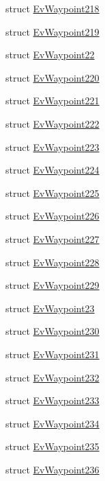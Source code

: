 \begin{DoxyCompactItemize}
\item 
struct \hyperlink{structcl__move__base__z_1_1EvWaypoint218}{Ev\+Waypoint218}
\item 
struct \hyperlink{structcl__move__base__z_1_1EvWaypoint219}{Ev\+Waypoint219}
\item 
struct \hyperlink{structcl__move__base__z_1_1EvWaypoint22}{Ev\+Waypoint22}
\item 
struct \hyperlink{structcl__move__base__z_1_1EvWaypoint220}{Ev\+Waypoint220}
\item 
struct \hyperlink{structcl__move__base__z_1_1EvWaypoint221}{Ev\+Waypoint221}
\item 
struct \hyperlink{structcl__move__base__z_1_1EvWaypoint222}{Ev\+Waypoint222}
\item 
struct \hyperlink{structcl__move__base__z_1_1EvWaypoint223}{Ev\+Waypoint223}
\item 
struct \hyperlink{structcl__move__base__z_1_1EvWaypoint224}{Ev\+Waypoint224}
\item 
struct \hyperlink{structcl__move__base__z_1_1EvWaypoint225}{Ev\+Waypoint225}
\item 
struct \hyperlink{structcl__move__base__z_1_1EvWaypoint226}{Ev\+Waypoint226}
\item 
struct \hyperlink{structcl__move__base__z_1_1EvWaypoint227}{Ev\+Waypoint227}
\item 
struct \hyperlink{structcl__move__base__z_1_1EvWaypoint228}{Ev\+Waypoint228}
\item 
struct \hyperlink{structcl__move__base__z_1_1EvWaypoint229}{Ev\+Waypoint229}
\item 
struct \hyperlink{structcl__move__base__z_1_1EvWaypoint23}{Ev\+Waypoint23}
\item 
struct \hyperlink{structcl__move__base__z_1_1EvWaypoint230}{Ev\+Waypoint230}
\item 
struct \hyperlink{structcl__move__base__z_1_1EvWaypoint231}{Ev\+Waypoint231}
\item 
struct \hyperlink{structcl__move__base__z_1_1EvWaypoint232}{Ev\+Waypoint232}
\item 
struct \hyperlink{structcl__move__base__z_1_1EvWaypoint233}{Ev\+Waypoint233}
\item 
struct \hyperlink{structcl__move__base__z_1_1EvWaypoint234}{Ev\+Waypoint234}
\item 
struct \hyperlink{structcl__move__base__z_1_1EvWaypoint235}{Ev\+Waypoint235}
\item 
struct \hyperlink{structcl__move__base__z_1_1EvWaypoint236}{Ev\+Waypoint236}

\end{DoxyCompactItemize}
